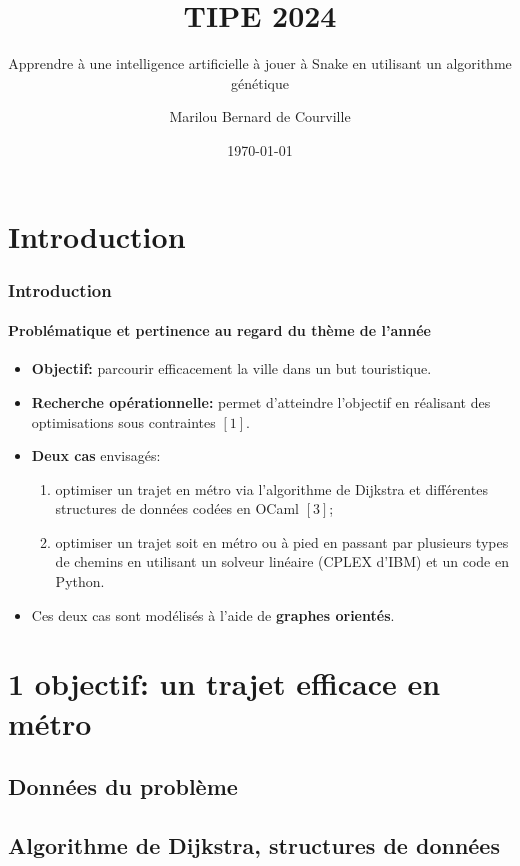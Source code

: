 \documentclass[10pt]{beamer}
\title{TIPE 2024}
\subtitle{Apprendre à une intelligence artificielle à jouer à Snake en utilisant un algorithme génétique}
\author{Marilou Bernard de Courville}
\institute{N\textsuperscript{\underline{o}} SCEI 41188}
\date{\today}
\begin{document}
 
\begin{frame}
    \titlepage
\end{frame}


\section{Introduction}

\begin{frame}
\frametitle{Introduction}
\framesubtitle{Problématique et pertinence au regard du thème de l'année}

\begin{itemize}
\item \textbf{Objectif:} parcourir efficacement la ville dans un but touristique.
\item \textbf{Recherche opérationnelle:} permet d'atteindre l'objectif en réalisant des optimisations sous contraintes $[1]$.
\item \textbf{Deux cas} envisagés:
  \begin{enumerate}
  \item optimiser un trajet en métro via l'algorithme de Dijkstra et différentes structures de données codées en OCaml $[3]$;
  \item optimiser un trajet soit en métro ou à pied en passant par plusieurs types de chemins en utilisant un solveur linéaire (CPLEX d'IBM) et un code en Python.
  \end{enumerate}
\item Ces deux cas sont modélisés à l'aide de \textbf{graphes orientés}.
\end{itemize}

\end{frame}

\section{\textbf{1\ier{} objectif}: un trajet efficace en métro}

\subsection{Données du problème}

\subsection{Algorithme de Dijkstra, structures de données}
\end{document}
